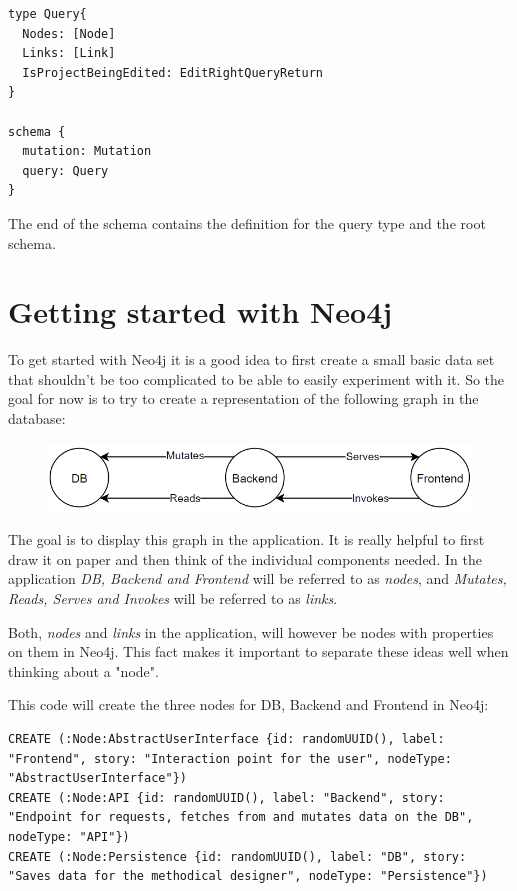 \begin{lstlisting}[caption={Root Type Definitions}]
type Query{
  Nodes: [Node]
  Links: [Link]
  IsProjectBeingEdited: EditRightQueryReturn
}

schema {
  mutation: Mutation
  query: Query
}
\end{lstlisting}

The end of the schema contains the definition for the query type and the root schema.

\section{Getting started with Neo4j}
\label{chap:StartNeo}
To get started with Neo4j it is a good idea to first create a small basic data set that shouldn't be too complicated to be able to easily experiment with it. So the goal for now is to try to create a representation of the following graph in the database:

\begin{figure}[H]
\centering
\includegraphics[scale=.8]{Bilder/BasicGraph.png}
\label{ex421}
\end{figure}

The goal is to display this graph in the application. It is really helpful to first draw it on paper and then think of the individual components needed. In the application \emph{DB, Backend and Frontend} will be referred to as \emph{nodes}, and \emph{Mutates, Reads, Serves and Invokes} will be referred to as \emph{links}.

Both, \emph{nodes} and \emph{links} in the application, will however be nodes with properties on them in Neo4j. This fact makes it important to separate these ideas well when thinking about a "node".

This code will create the three nodes for DB, Backend and Frontend in Neo4j:
\lstset{language=Cypher}
\begin{lstlisting}[caption={Cypher Statements to Create the Nodes}]
CREATE (:Node:AbstractUserInterface {id: randomUUID(), label: "Frontend", story: "Interaction point for the user", nodeType: "AbstractUserInterface"})
CREATE (:Node:API {id: randomUUID(), label: "Backend", story: "Endpoint for requests, fetches from and mutates data on the DB", nodeType: "API"})
CREATE (:Node:Persistence {id: randomUUID(), label: "DB", story: "Saves data for the methodical designer", nodeType: "Persistence"})
\end{lstlisting}

